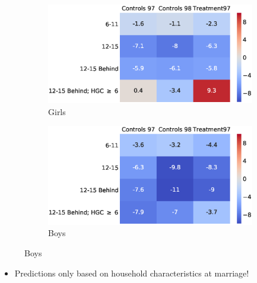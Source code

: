 \documentclass[11pt]{beamer}
\begin{document}
\begin{frame}[c]%
\begin{figure}
        \centering
        \caption{Actual and Predicted Schooling N-Years Ahead}
        \begin{subfigure}[c]{0.5\textwidth}
            \centering
            \includegraphics[width=\textwidth]{graphs/girls_table2_school.eps}
            \caption{Girls}
        \end{subfigure}%
        \begin{subfigure}[c]{0.5\textwidth}
            \centering
            \includegraphics[width=\textwidth]{graphs/boys_table2_school.eps}
            \caption{Boys}
        \end{subfigure}
\end{figure}
\begin{itemize}
    \item Predictions only based on household characteristics at marriage!
\end{itemize}
\end{frame}
\end{document}
